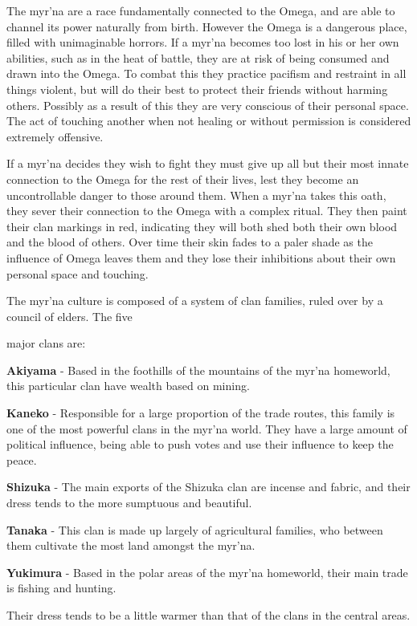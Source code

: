 The myr'na are a race fundamentally connected to the Omega, and are able to channel its power naturally from birth. However the Omega is a dangerous place, filled with unimaginable horrors. If a myr'na becomes too lost in his or her own abilities, such as in the heat of battle, they are at risk of being consumed and drawn into the Omega. To combat this they practice pacifism and restraint in all things violent, but will do their best to protect their friends without harming others. Possibly as a result of this they are very conscious of their personal space. The act of touching another when not healing or without permission is considered extremely offensive.

If a myr'na decides they wish to fight they must give up all but their most innate connection to the Omega for the rest of their lives, lest they become an uncontrollable danger to those around them. When a myr'na takes this oath, they sever their connection to the Omega with a complex ritual. They then paint their clan markings in red, indicating they will both shed both their own blood and the blood of others. Over time their skin fades to a paler shade as the influence of Omega leaves them and they lose their inhibitions about their own personal space and touching.

The myr'na culture is composed of a system of clan families, ruled over by a council of elders. The five

major clans are:

\textbf{Akiyama} - Based in the foothills of the mountains of the myr'na homeworld, this particular clan have wealth based on mining.

\textbf{Kaneko} - Responsible for a large proportion of the trade routes, this family is one of the most powerful clans in the myr'na world. They have a large amount of political influence, being able to push votes and use their influence to keep the peace.

\textbf{Shizuka} - The main exports of the Shizuka clan are incense and fabric, and their dress tends to the more sumptuous and beautiful.

\textbf{Tanaka} - This clan is made up largely of agricultural families, who between them cultivate the most land amongst the myr'na.

\textbf{Yukimura} - Based in the polar areas of the myr'na homeworld, their main trade is fishing and hunting.

Their dress tends to be a little warmer than that of the clans in the central areas.

